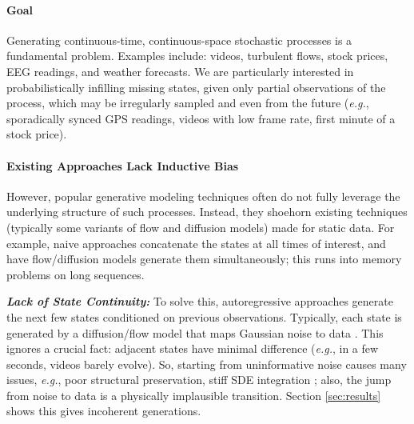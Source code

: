 \documentclass{article}
\begin{document}
\paragraph{Goal} Generating continuous-time, continuous-space stochastic processes is a fundamental problem.
Examples include: videos, turbulent flows, stock prices, EEG readings, and weather forecasts.
We are particularly interested in probabilistically infilling missing states, given only partial observations of the process, which may be irregularly sampled and even from the future (\textit{e.g.}, sporadically synced GPS readings, videos with low frame rate, first minute of a stock price). %

\paragraph{Existing Approaches Lack Inductive Bias} However, popular generative modeling techniques often do not fully leverage the underlying structure of such processes.
Instead, they shoehorn existing techniques (typically some variants of flow \cite{albergo2023stochastic, lipman2022flow} and diffusion \cite{song2020score} models) made for static data.
For example, naive approaches concatenate the states at all times of interest, and have flow/diffusion models generate them simultaneously; this runs into memory problems on long sequences.

\textbf{\textit{Lack of State Continuity:}} To solve this, autoregressive approaches generate the next few states conditioned on previous observations.
Typically, each state is generated by a diffusion/flow model that maps Gaussian noise to data \cite{zhang2025frame, zhang2025pretraining}.
This ignores a crucial fact: adjacent states have minimal difference (\textit{e.g.}, in a few seconds, videos barely evolve). So, starting from uninformative noise causes many issues, \textit{e.g.}, poor structural preservation, stiff SDE integration \cite{zhou2023denoising}; also, the jump from noise to data is a physically implausible transition. Section \ref{sec:results} shows this gives incoherent generations.
\end{document}
